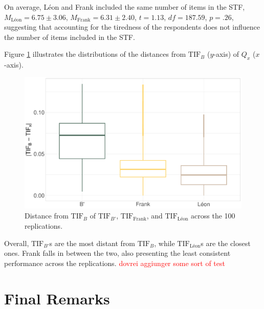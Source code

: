 \documentclass{svproc}
\newcommand{\ottavia}[1]{\textcolor{red}{#1}}
\begin{document}
On average, Léon and Frank included the same number of items in the STF, $M_{\text{Léon}} = 6.75 \pm 3.06$, $M_{\text{Frank}} = 6.31 \pm 2.40$, $t = 1.13$, $df = 187.59$, $p = .26$, suggesting that accounting for the tiredness of the respondents does not influence the number of items included in the STF.

Figure \ref{fig:points-alogirthms} illustrates the distributions of the distances from $\text{TIF}_B$ ($y$-axis) of $Q_x$ ($x$-axis).

\begin{figure}[!h]
	\centering
	\includegraphics[width=\linewidth]{img/box-plot-alogirthms}
	\caption{Distance from $\text{TIF}_{B}$ of $\text{TIF}_{B'}$, $\text{TIF}_{\text{Frank}}$, and $\text{TIF}_{\text{Léon}}$  across the 100 replications.} 
	\label{fig:points-alogirthms}
\end{figure}

Overall, $\text{TIF}_{B'}$s are the most distant from $\text{TIF}_B$, while $\text{TIF}_{\text{Léon}}$s are the closest ones. Frank falls in between the two, also presenting the least consistent performance across the replications. \ottavia{dovrei aggiunger some sort of test}

\section{Final Remarks}
\end{document}
